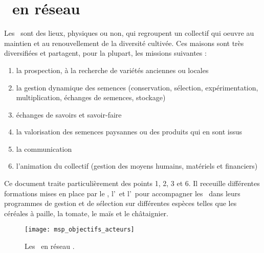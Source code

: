\section{\MSPs~en réseau}

\begin{multicols}{2}
Les \MSPs~sont des lieux, physiques ou non, qui regroupent un collectif qui oeuvre au maintien et au renouvellement de la diversité cultivée.
Ces maisons sont très diversifiées et partagent, pour la plupart, les missions suivantes \cite{rsp_msp_2014}:

\begin{enumerate}
\item la prospection, à la recherche de variétés anciennes ou locales
\item la  gestion dynamique des semences (conservation, sélection, expérimentation, multiplication, échanges de semences, stockage)
\item échanges de savoirs et savoir-faire
\item la valorisation des semences paysannes ou des produits qui en sont issus
\item la communication
\item l'animation du collectif (gestion des moyens humains, matériels et financiers)
\end{enumerate}

Ce document traite particulièrement des points 1, 2, 3 et 6.
Il receuille différentes formations mises en place par le \RSP, l'\ITAB~et l'\INRA~pour accompagner les \MSPs~dans leurs programmes de gestion et de sélection sur différentes espèces telles que 
les céréales à paille, 
la tomate, 
le maïs et 
le châtaignier.

\columnbreak

\begin{figure}[H]
\centering\texttt{[image: msp\_objectifs\_acteurs]}
\caption{Les \MSPs~en réseau \cite{msp_objectifs_acteurs}.}
\end{figure}

\end{multicols}

